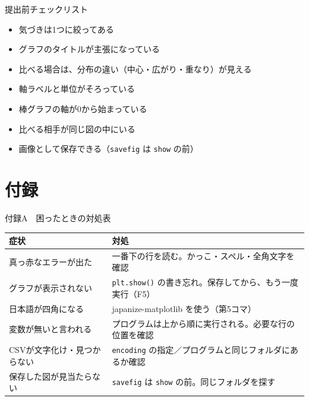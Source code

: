 \documentclass[aspectratio=169,11pt]{beamer}
\begin{document}
\begin{frame}{提出前チェックリスト}
\begin{itemize}
\item[$\square$] 気づきは1つに絞ってある
\item[$\square$] グラフのタイトルが主張になっている
\item[$\square$] 比べる場合は、分布の違い（中心・広がり・重なり）が見える
\item[$\square$] 軸ラベルと単位がそろっている
\item[$\square$] 棒グラフの軸が0から始まっている
\item[$\square$] 比べる相手が同じ図の中にいる
\item[$\square$] 画像として保存できる（\texttt{savefig} は \texttt{show} の前）
\end{itemize}
\end{frame}

\section{付録}
\begin{frame}{付録A　困ったときの対処表}
\begin{center}
\begin{tabular}{lp{8.4cm}}
\toprule
症状 & 対処 \\
\midrule
真っ赤なエラーが出た & 一番下の行を読む。かっこ・スペル・全角文字を確認 \\
グラフが表示されない & \texttt{plt.show()} の書き忘れ。保存してから、もう一度実行（F5） \\
日本語が四角になる & japanize-matplotlib を使う（第5コマ） \\
変数が無いと言われる & プログラムは上から順に実行される。必要な行の位置を確認 \\
CSVが文字化け・見つからない & \texttt{encoding} の指定／プログラムと同じフォルダにあるか確認 \\
保存した図が見当たらない & \texttt{savefig} は \texttt{show} の前。同じフォルダを探す \\
\bottomrule
\end{tabular}
\end{center}
\end{frame}
\end{document}
